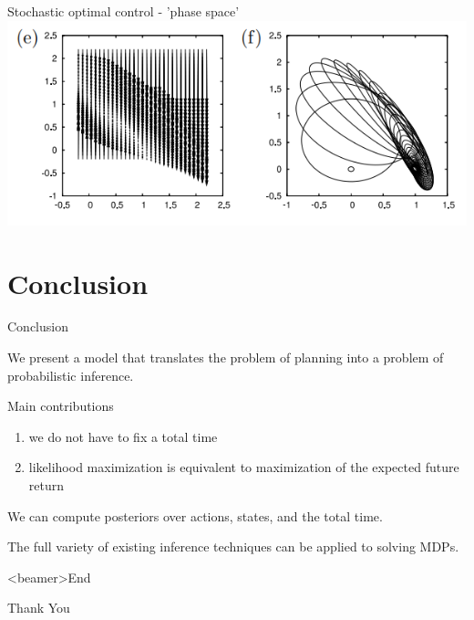 \documentclass[]{beamer}
\theoremstyle{definition}
\begin{document}
\begin{frame}{Stochastic optimal control - 'phase space'}
    \includegraphics[width=\textwidth]{figs/fig_4ef_control_example.png}
\end{frame}



\section{Conclusion}
\begin{frame}{Conclusion}
	\begin{block}{}
	    We present a model that translates the problem of planning into a problem of probabilistic inference.
	\end{block}
	\pause
	\begin{block}{Main contributions}
	     \begin{enumerate}
	         \item we do not have to fix a total time
	         \item likelihood maximization is equivalent to maximization of the expected future return
 	   \end{enumerate}
	\end{block}
	\pause
	\begin{block}{}
	     We can compute posteriors over actions, states, and the total time.
	\end{block}
	\pause
	\begin{block}{}
	     The full variety of existing inference techniques can be applied to solving MDPs.
	\end{block}
\end{frame}

\begin{frame}<beamer>{End}
	\begin{center}
		{\Huge\calligra Thank You}
	\end{center}
\end{frame}
\end{document}
